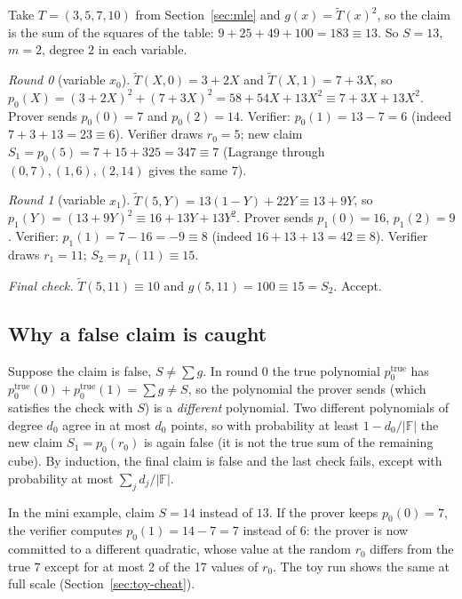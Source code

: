 \documentclass[11pt,a4paper]{article}
\newcommand{\Z}{\mathbb{Z}}
\newcommand{\F}{\mathbb{F}}
\newcommand{\mle}[1]{\widetilde{#1}}
\theoremstyle{definition}
\theoremstyle{plain}
\begin{document}
\begin{example}[A complete sumcheck over $\Z_{17}$]
Take $T=(3,5,7,10)$ from Section~\ref{sec:mle} and $g(x)=\mle T(x)^2$, so the claim is the sum of the
squares of the table: $9+25+49+100=183\equiv 13$. So $S=13$, $m=2$, degree $2$ in each variable.

\emph{Round 0} (variable $x_0$). $\mle T(X,0)=3+2X$ and $\mle T(X,1)=7+3X$, so
$p_0(X)=(3+2X)^2+(7+3X)^2=58+54X+13X^2\equiv 7+3X+13X^2$.
Prover sends $p_0(0)=7$ and $p_0(2)=14$. Verifier: $p_0(1)=13-7=6$ (indeed $7+3+13=23\equiv 6$).
Verifier draws $r_0=5$; new claim $S_1=p_0(5)=7+15+325=347\equiv 7$
(Lagrange through $(0,7),(1,6),(2,14)$ gives the same $7$).

\emph{Round 1} (variable $x_1$). $\mle T(5,Y)=13(1-Y)+22Y\equiv 13+9Y$, so
$p_1(Y)=(13+9Y)^2\equiv 16+13Y+13Y^2$. Prover sends $p_1(0)=16$, $p_1(2)=9$. Verifier:
$p_1(1)=7-16=-9\equiv 8$ (indeed $16+13+13=42\equiv 8$). Verifier draws $r_1=11$; $S_2=p_1(11)\equiv 15$.

\emph{Final check.} $\mle T(5,11)\equiv 10$ and $g(5,11)=100\equiv 15=S_2$. Accept.
\end{example}

\subsection{Why a false claim is caught}

Suppose the claim is false, $S\neq\sum g$. In round 0 the true polynomial $p_0^{\mathrm{true}}$ has
$p_0^{\mathrm{true}}(0)+p_0^{\mathrm{true}}(1)=\sum g\neq S$, so the polynomial the prover sends (which
satisfies the check with $S$) is a \emph{different} polynomial. Two different polynomials of degree
$d_0$ agree in at most $d_0$ points, so with probability at least $1-d_0/|\F|$ the new claim
$S_1=p_0(r_0)$ is again false (it is not the true sum of the remaining cube). By induction, the final
claim is false and the last check fails, except with probability at most
$\sum_jd_j/|\F|$.

\begin{example}
In the mini example, claim $S=14$ instead of $13$. If the prover keeps $p_0(0)=7$, the verifier
computes $p_0(1)=14-7=7$ instead of $6$: the prover is now committed to a different quadratic, whose
value at the random $r_0$ differs from the true $7$ except for at most 2 of the 17 values of $r_0$.
The toy run shows the same at full scale (Section~\ref{sec:toy-cheat}).
\end{example}
\end{document}
